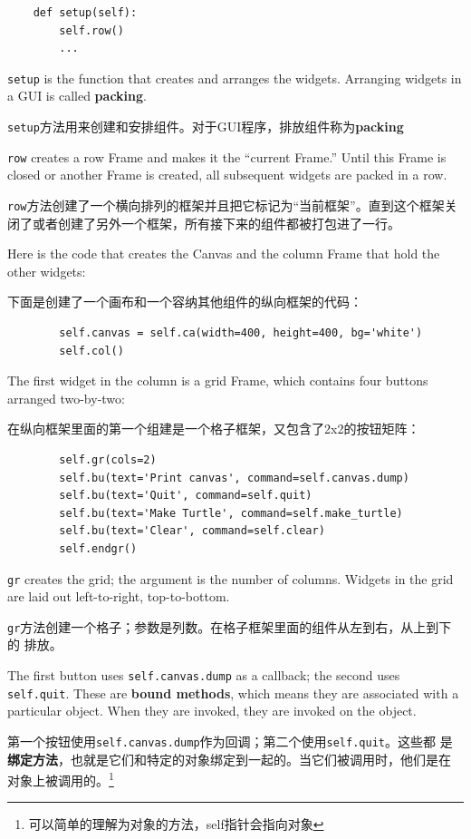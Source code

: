 \documentclass[10pt]{book}
\begin{document}
\begin{CJK}{UTF8}{gbsn}
\begin{verbatim}
    def setup(self):
        self.row()
        ...
\end{verbatim}
%
{\tt setup} is the function that creates and arranges the widgets.
Arranging widgets in a GUI is called {\bf packing}.

{\tt setup}方法用来创建和安排组件。对于GUI程序，排放组件称为{\bf packing}

{\tt row} creates a row Frame and makes it the ``current Frame.''
Until this Frame is closed or another Frame is created, all
subsequent widgets are packed in a row.

{\tt row}方法创建了一个横向排列的框架并且把它标记为``当前框架''。直到这个框架关
闭了或者创建了另外一个框架，所有接下来的组件都被打包进了一行。

Here is the code that creates the Canvas and the column Frame
that hold the other widgets:

下面是创建了一个画布和一个容纳其他组件的纵向框架的代码：

\begin{verbatim}
        self.canvas = self.ca(width=400, height=400, bg='white')
        self.col()
\end{verbatim}
%
The first widget in the column is a grid Frame, which contains
four buttons arranged two-by-two:

在纵向框架里面的第一个组建是一个格子框架，又包含了2x2的按钮矩阵：

\begin{verbatim}
        self.gr(cols=2)
        self.bu(text='Print canvas', command=self.canvas.dump)
        self.bu(text='Quit', command=self.quit)
        self.bu(text='Make Turtle', command=self.make_turtle)
        self.bu(text='Clear', command=self.clear)
        self.endgr()
\end{verbatim}
%
{\tt gr} creates the grid; the argument is the number of
columns.  Widgets in the grid are
laid out left-to-right, top-to-bottom.

{\tt gr}方法创建一个格子；参数是列数。在格子框架里面的组件从左到右，从上到下的
排放。

The first button uses {\tt self.canvas.dump} as a callback; the second
uses {\tt self.quit}.  These are {\bf bound methods}, which means they
are associated with a particular object.  When they are invoked, they
are invoked on the object.

第一个按钮使用{\tt self.canvas.dump}作为回调；第二个使用{\tt self.quit}。这些都
是{\bf 绑定方法}，也就是它们和特定的对象绑定到一起的。当它们被调用时，他们是在
对象上被调用的。\footnote{可以简单的理解为对象的方法，self指针会指向对象}


\end{CJK}
\end{document}
